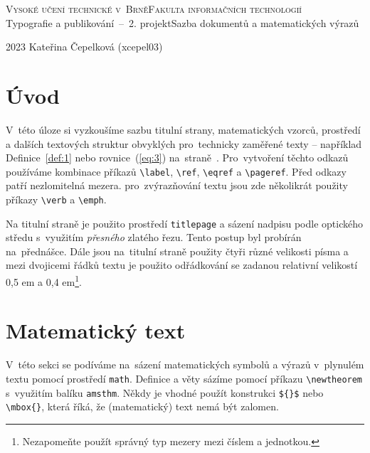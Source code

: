 \documentclass[11pt,a4paper, twocolumn]{article}
\theoremstyle{definition}
\theoremstyle{definition}
\begin{document}
 
\theoremstyle{plain}
    \begin{titlepage}
        \begin{center}
            \Huge
            \textsc{
                    Vysoké učení technické v~Brně\linebreak[5.0em] 
                \huge Fakulta informačních technologií\\
                }
            \LARGE
                    Typografie a publikování\, --\, 2. projekt\linebreak[4.0em]
                    Sazba dokumentů a matematických výrazů
        \end{center}

        {\Large 2023 \hfill Kateřina Čepelková (xcepel03)}
    
    \end{titlepage}


\section*{Úvod}\label{sec:Úvod}
V~této úloze si vyzkoušíme sazbu titulní strany, matematických vzorců, prostředí a dalších textových struktur obvyklých pro~technicky zaměřené texty -- například Definice~\ref{def:1} nebo rovnice~(\ref{eq:3}) na~straně~\pageref{def:1}. Pro~vytvoření těchto odkazů používáme kombinace příkazů \verb|\label|, \verb|\ref|, \verb|\eqref| a \verb|\pageref|. Před odkazy patří nezlomitelná mezera. pro~zvýrazňování textu jsou zde několikrát použity příkazy \verb|\verb| a \verb|\emph|. 

Na titulní straně je použito prostředí \verb|titlepage| a sázení nadpisu podle optického středu s~využitím \emph{přesného} zlatého řezu. Tento postup byl probírán na~přednášce. Dále jsou na~titulní straně použity čtyři různé velikosti písma a mezi dvojicemi řádků textu je použito odřádkování se zadanou relativní velikostí 0,5 em a 0,4 em\footnote[1]{Nezapomeňte použít správný typ mezery mezi číslem a jednotkou.}.

\section{Matematický text}\label{sec:Matematický text}
V~této sekci se podíváme na~sázení matematických symbolů a výrazů v~plynulém textu pomocí prostředí \verb|math|. Definice a věty sázíme pomocí příkazu \verb|\newtheorem| s~využitím balíku \verb|amsthm|. Někdy je vhodné použít konstrukci \verb|${}$| nebo \verb|\mbox{}|, která říká, že (matematický) text nemá být zalomen. 
\end{document}
